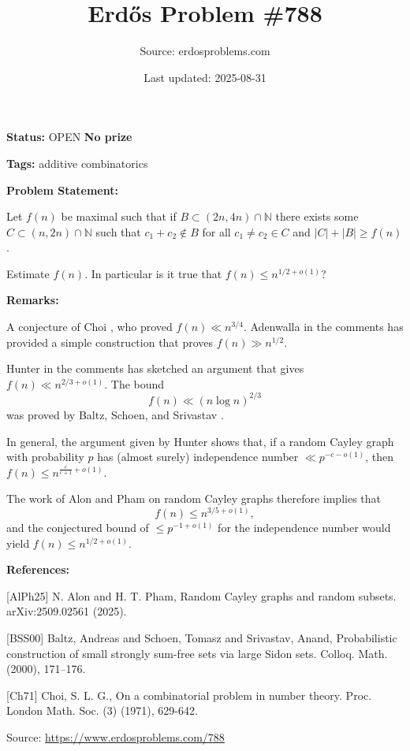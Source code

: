 \documentclass{article}
\title{Erd\H{o}s Problem \#788}
\date{Last updated: 2025-08-31}
\author{Source: erdosproblems.com}
\begin{document}
\maketitle

\noindent\textbf{Status:} OPEN \quad \textbf{No prize}

\noindent\textbf{Tags:} additive combinatorics

\medskip
\noindent\textbf{Problem Statement:}

Let $f(n)$ be maximal such that if $B\subset (2n,4n)\cap \mathbb{N}$ there exists some $C\subset (n,2n)\cap \mathbb{N}$ such that $c_1+c_2\not\in B$ for all $c_1\neq c_2\in C$ and $\lvert C\rvert+\lvert B\rvert \geq f(n)$. 

Estimate $f(n)$. In particular is it true that $f(n)\leq n^{1/2+o(1)}$?

\bigskip
\noindent\textbf{Remarks:}

A conjecture of Choi \cite{Ch71}, who proved $f(n) \ll n^{3/4}$. Adenwalla in the comments has provided a simple construction that proves $f(n) \gg n^{1/2}$.

Hunter in the comments has sketched an argument that gives $f(n) \ll n^{2/3+o(1)}$. The bound\[f(n) \ll (n\log n)^{2/3}\]was proved by Baltz, Schoen, and Srivastav \cite{BSS00}.

In general, the argument given by Hunter shows that, if a random Cayley graph with probability $p$ has (almost surely) independence number $\ll p^{-c-o(1)}$, then $f(n) \leq n^{\frac{c}{c+1}+o(1)}$.

The work of Alon and Pham \cite{AlPh25} on random Cayley graphs therefore implies that\[f(n) \leq n^{3/5+o(1)},\]and the conjectured bound of $\leq p^{-1+o(1)}$ for the independence number would yield $f(n)\leq n^{1/2+o(1)}$.

\bigskip
\noindent\textbf{References:}

[AlPh25] N. Alon and H. T. Pham, Random Cayley graphs and random subsets. arXiv:2509.02561 (2025).
 
 [BSS00] Baltz, Andreas and Schoen, Tomasz and Srivastav, Anand, Probabilistic construction of small strongly sum-free sets via
large Sidon sets. Colloq. Math. (2000), 171--176.
 
 [Ch71] Choi, S. L. G., On a combinatorial problem in number theory. Proc. London Math. Soc. (3) (1971), 629-642.

\bigskip
\noindent\small{Source: \url{https://www.erdosproblems.com/788}}
\end{document}
